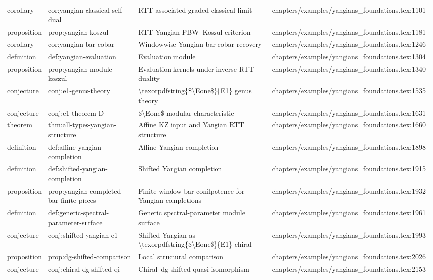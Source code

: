 \documentclass[11pt]{article}
\begin{document}
\begin{longtable}{L{0.10\textwidth}L{0.26\textwidth}L{0.42\textwidth}L{0.22\textwidth}}
corollary & cor:yangian-classical-self-dual & RTT associated-graded classical limit & chapters/examples/yangians\_foundations.tex:1101\\
proposition & prop:yangian-koszul & RTT Yangian PBW--Koszul criterion & chapters/examples/yangians\_foundations.tex:1181\\
corollary & cor:yangian-bar-cobar & Windowwise Yangian bar-cobar recovery & chapters/examples/yangians\_foundations.tex:1246\\
definition & def:yangian-evaluation & Evaluation module & chapters/examples/yangians\_foundations.tex:1304\\
proposition & prop:yangian-module-koszul & Evaluation kernels under inverse RTT duality & chapters/examples/yangians\_foundations.tex:1340\\
conjecture & conj:e1-genus-theory & \textbackslash{}texorpdfstring\{\$\textbackslash{}Eone\$\}\{E1\} genus theory & chapters/examples/yangians\_foundations.tex:1535\\
conjecture & conj:e1-theorem-D & \$\textbackslash{}Eone\$ modular characteristic & chapters/examples/yangians\_foundations.tex:1631\\
theorem & thm:all-types-yangian-structure & Affine KZ input and Yangian RTT structure & chapters/examples/yangians\_foundations.tex:1660\\
definition & def:affine-yangian-completion & Affine Yangian completion & chapters/examples/yangians\_foundations.tex:1898\\
definition & def:shifted-yangian-completion & Shifted Yangian completion & chapters/examples/yangians\_foundations.tex:1915\\
proposition & prop:yangian-completed-bar-finite-pieces & Finite-window bar conilpotence for Yangian completions & chapters/examples/yangians\_foundations.tex:1932\\
definition & def:generic-spectral-parameter-surface & Generic spectral-parameter module surface & chapters/examples/yangians\_foundations.tex:1961\\
conjecture & conj:shifted-yangian-e1 & Shifted Yangian as \textbackslash{}texorpdfstring\{\$\textbackslash{}Eone\$\}\{E1\}-chiral & chapters/examples/yangians\_foundations.tex:1993\\
proposition & prop:dg-shifted-comparison & Local structural comparison & chapters/examples/yangians\_foundations.tex:2026\\
conjecture & conj:chiral-dg-shifted-qi & Chiral--dg-shifted quasi-isomorphism & chapters/examples/yangians\_foundations.tex:2153\\

\end{longtable}
\end{document}
